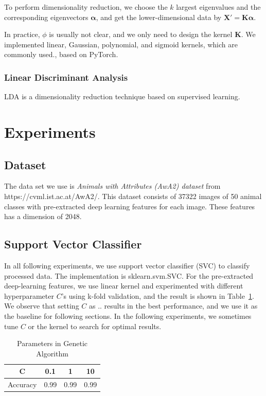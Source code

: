 \documentclass[journal]{IEEEtran}
\begin{document}
To perform dimensionality reduction, we choose the $k$ largest eigenvalues and the corresponding eigenvectors $\boldsymbol \alpha$, and get the lower-dimensional data by $\mathbf X' = \mathbf K \boldsymbol \alpha$.

In practice, $\phi$ is usually not clear, and we only need to design the kernel $\mathbf K$. We implemented linear, Gaussian, polynomial, and sigmoid kernels, which are commonly used., based on PyTorch.

\subsubsection{Linear Discriminant Analysis}
LDA is a dimensionality reduction technique based on supervised learning.

\section{Experiments}
\label{sec:3}
\subsection{Dataset}
The data set we use is \emph{Animals with Attributes (AwA2) dataset} from https://cvml.ist.ac.at/AwA2/. This dataset consists of 37322
images of 50 animal classes with pre-extracted deep learning features for each image. These features has a dimension of 2048.
\subsection{Support Vector Classifier}
In all following experiments, we use support vector classifier (SVC) to classify processed data. The implementation is sklearn.svm.SVC. For the pre-extracted deep-learning features, we use linear kernel and experimented with different hyperparameter $C$'s using k-fold validation, and the result is shown in Table~\ref{tab:1}. We observe that setting $C$ as .. results in the best performance, and we use it as the baseline for following sections. In the following experiments, we sometimes tune $C$ or the kernel to search for optimal results. 
\begin{table}[htbp]
\centering
\caption{Parameters in Genetic Algorithm}
\label{tab:1}
\begin{tabular}{cccc}
\toprule
C&0.1&1&10 \\  %
\midrule
Accuracy&0.99&0.99&0.99\\ 
\bottomrule
\end{tabular}
\end{table}
\end{document}
